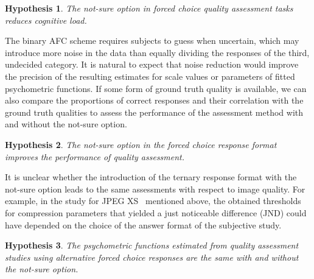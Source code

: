 \documentclass[a4paper,conference]{IEEEtran}
\begin{document}
\newtheorem{hyp}{Hypothesis}
\begin{hyp}
\label{hyp_cognitive}
The not-sure option in forced choice quality assessment tasks reduces cognitive load.
\end{hyp}

The binary AFC scheme requires subjects to guess when uncertain, which may introduce more noise in the data than equally dividing the responses of the third, undecided category. It is natural to expect that noise reduction would improve the precision of the resulting estimates for scale values or parameters of fitted psychometric functions. If some form of ground truth quality is available, we can also compare the proportions of correct responses and their correlation with the ground truth qualities to assess the performance of the assessment method with and without the not-sure option.

\begin{hyp}
\label{hyp_performance}
The not-sure option in the forced choice response format improves the performance of quality assessment.
\end{hyp}

It is unclear whether the introduction of the ternary response format with the not-sure option leads to the same assessments with respect to image quality. For example, in the study for JPEG XS~\cite{mcnally2017jpeg} mentioned above, the obtained thresholds for compression parameters that yielded a just noticeable difference (JND) could have depended on the choice of the answer format of the subjective study.

\begin{hyp}
\label{hyp_homogeneity}
The psychometric functions estimated from quality assessment studies using alternative forced choice responses are the same with and without the not-sure option.
\end{hyp}



 
\end{document}
